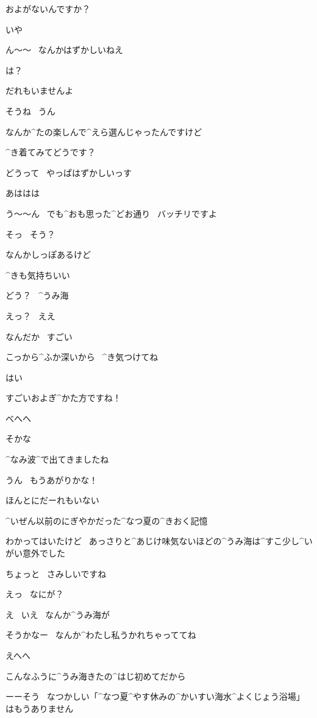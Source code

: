 \Kokone およがないんですか？

\Alpha いや

\Alpha ん〜〜
\ なんかはずかしいねえ

\Kokone は？

\Kokone だれもいませんよ

\Alpha そうね
\ うん

\page
\Kokone なんか^{たの}{楽}しんで^{えら}{選}んじゃったんですけど

\Kokone ^{き}{着}てみてどうです？

\Alpha どうって
\ やっぱはずかしいっす

\Alpha あははは

\Kokone う〜〜ん
\ でも^{おも}{思}った^{どお}{通}り
\ バッチリですよ

\Alpha そっ
\ そう？

\Alpha なんかしっぽあるけど

\page
\Kokone ^{きも}{気持}ちいい

\page
\Alpha どう？
\ ^{うみ}{海}

\Kokone えっ？
\ ええ

\Kokone なんだか
\ すごい

\Alpha こっから^{ふか}{深}いから
\ ^{き}{気}つけてね

\Kokone はい

\page[30]
\Kokone すごいおよぎ^{かた}{方}ですね！

\Alpha べへへ

\Alpha そかな

\page
\Kokone ^{なみ}{波}^{で}{出}てきましたね

\Alpha うん
\ もうあがりかな！

\Kokone ほんとにだーれもいない

\Kokone ^{いぜん}{以前}のにぎやかだった^{なつ}{夏}の^{きおく}{記憶}

\Kokone わかってはいたけど
\ あっさりと^{あじけ}{味気}ないほどの^{うみ}{海}は^{すこ}{少}し^{いがい}{意外}でした

\page
\Kokone ちょっと
\ さみしいですね

\Alpha えっ
\ なにが？

\Kokone え
\ いえ
\ なんか^{うみ}{海}が

\Alpha そうかなー
\ なんか^{わたし}{私}うかれちゃっててね

\Alpha えへへ

\Alpha こんなふうに^{うみ}{海}きたの^{はじ}{初}めてだから

\page
\Narrator ーーそう
\ なつかしい「^{なつ}{夏}^{やす}{休}みの^{かいすい}{海水}^{よくじょう}{浴場}」はもうありません

